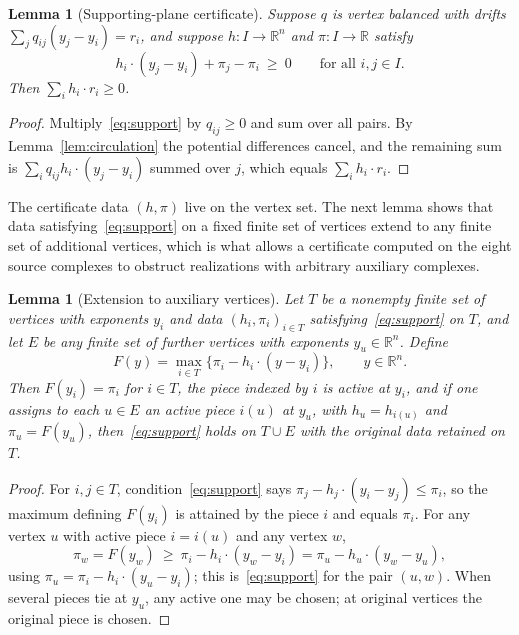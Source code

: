 \documentclass[11pt,a4paper]{article}
\theoremstyle{plain}
\newtheorem{lemma}[theorem]{Lemma}
\theoremstyle{definition}
\theoremstyle{remark}
\newcommand{\R}{\mathbb{R}}
\begin{document}
\begin{lemma}[Supporting-plane certificate]\label{lem:dual}
Suppose $q$ is vertex balanced with drifts $\sum_jq_{ij}(y_j-y_i)=r_i$, and suppose $h:I\to\R^n$ and $\pi:I\to\R$ satisfy
\begin{equation}\label{eq:support}
h_i\cdot(y_j-y_i)+\pi_j-\pi_i\ \ge\ 0\qquad\text{for all }i,j\in I.
\end{equation}
Then $\sum_ih_i\cdot r_i\ge0$.
\end{lemma}
\begin{proof}
Multiply~\eqref{eq:support} by $q_{ij}\ge0$ and sum over all pairs. By Lemma~\ref{lem:circulation} the potential differences cancel, and the remaining sum is $\sum_iq_{ij}h_i\cdot(y_j-y_i)$ summed over $j$, which equals $\sum_ih_i\cdot r_i$.
\end{proof}

The certificate data $(h,\pi)$ live on the vertex set. The next lemma shows that data satisfying~\eqref{eq:support} on a fixed finite set of vertices extend to any finite set of additional vertices, which is what allows a certificate computed on the eight source complexes to obstruct realizations with arbitrary auxiliary complexes.

\begin{lemma}[Extension to auxiliary vertices]\label{lem:extend}
Let $T$ be a nonempty finite set of vertices with exponents $y_i$ and data $(h_i,\pi_i)_{i\in T}$ satisfying~\eqref{eq:support} on $T$, and let $E$ be any finite set of further vertices with exponents $y_u\in\R^n$. Define
\[
F(y)=\max_{i\in T}\bigl\{\pi_i-h_i\cdot(y-y_i)\bigr\},\qquad y\in\R^n .
\]
Then $F(y_i)=\pi_i$ for $i\in T$, the piece indexed by $i$ is active at $y_i$, and if one assigns to each $u\in E$ an active piece $i(u)$ at $y_u$, with $h_u=h_{i(u)}$ and $\pi_u=F(y_u)$, then~\eqref{eq:support} holds on $T\cup E$ with the original data retained on $T$.
\end{lemma}
\begin{proof}
For $i,j\in T$, condition~\eqref{eq:support} says $\pi_j-h_j\cdot(y_i-y_j)\le\pi_i$, so the maximum defining $F(y_i)$ is attained by the piece $i$ and equals $\pi_i$. For any vertex $u$ with active piece $i=i(u)$ and any vertex $w$,
\[
\pi_w=F(y_w)\ \ge\ \pi_i-h_i\cdot(y_w-y_i)=\pi_u-h_u\cdot(y_w-y_u),
\]
using $\pi_u=\pi_i-h_i\cdot(y_u-y_i)$; this is~\eqref{eq:support} for the pair $(u,w)$. When several pieces tie at $y_u$, any active one may be chosen; at original vertices the original piece is chosen.
\end{proof}
\end{document}
